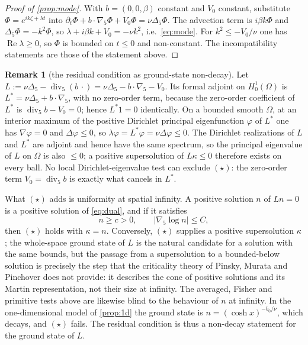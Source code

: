 \documentclass[11pt]{article}
\theoremstyle{definition}
\newtheorem{remark}[theorem]{Remark}
\newcommand{\Div}{\operatorname{div}}
\begin{document}
\begin{proof}[Proof of \cref{prop:mode}]
With $b=(0,0,\beta)$ constant and $V_0$ constant, substitute
$\Phi=e^{ik\zeta+\lambda t}$ into
$\partial_t\Phi+b\cdot\nabla_5\Phi+V_0\Phi=\nu\Delta_5\Phi$. The advection term
is $i\beta k\Phi$ and $\Delta_5\Phi=-k^2\Phi$, so
$\lambda+i\beta k+V_0=-\nu k^2$, i.e.\ \eqref{eq:mode}. For
$k^2\le-V_0/\nu$ one has $\operatorname{Re}\lambda\ge0$, so $\Phi$ is bounded
on $t\le0$ and non-constant. The incompatibility statements are those of the
statement above.
\end{proof}

\begin{remark}[the residual condition as ground-state non-decay]
\label{rem:groundstate}
Let $L:=\nu\Delta_5-\Div_5(b\,\cdot)=\nu\Delta_5-b\cdot\nabla_5-V_0$. Its formal
adjoint on $H^1_0(\Omega)$ is $L^*=\nu\Delta_5+b\cdot\nabla_5$, with no
zero-order term, because the zero-order coefficient of $L^*$ is
$\Div_5b-V_0=0$; hence $L^*1=0$ identically. On a bounded smooth $\Omega$, at an
interior maximum of the positive Dirichlet principal eigenfunction $\varphi$ of
$L^*$ one has $\nabla\varphi=0$ and $\Delta\varphi\le0$, so
$\lambda\varphi=L^*\varphi=\nu\Delta\varphi\le0$. The Dirichlet realizations of
$L$ and $L^*$ are adjoint and hence have the same spectrum, so the principal
eigenvalue of $L$ on $\Omega$ is also $\le0$; a positive supersolution of
$L\kappa\le0$ therefore exists on every ball. No local Dirichlet-eigenvalue
test can exclude $(\star)$: the zero-order term $V_0=\Div_5b$ is exactly what
cancels in $L^*$.

What $(\star)$ adds is uniformity at spatial infinity. A positive solution $n$
of $Ln=0$ is a positive solution of \eqref{eq:dual}, and if it satisfies
\begin{equation}\label{eq:groundbounds}
n\ge c>0,\qquad |\nabla_5\log n|\le C ,
\end{equation}
then $(\star)$ holds with $\kappa=n$. Conversely, $(\star)$ supplies a positive
supersolution $\kappa$; the whole-space ground state of $L$ is the natural
candidate for a solution with the same bounds, but the passage from a
supersolution to a bounded-below solution is precisely the step that the
criticality theory of Pinsky, Murata and Pinchover does not provide: it
describes the cone of positive solutions and its Martin representation, not
their size at infinity.
The averaged, Fisher and primitive tests above are likewise blind to the
behaviour of $n$ at infinity. In the one-dimensional model of \cref{prop:1d}
the ground state is $n=(\cosh x)^{-b_0/\nu}$, which decays, and $(\star)$
fails. The residual condition is thus a non-decay statement for the
ground state of $L$.
\end{remark}
\end{document}
